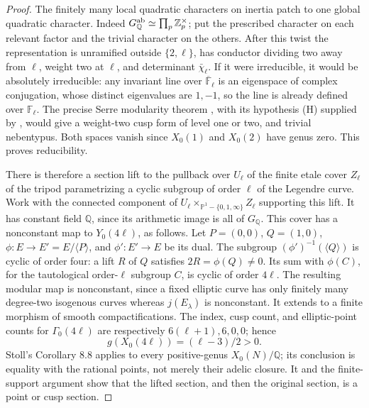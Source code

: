 \begin{proof}
The finitely many local quadratic characters
on inertia patch to one global quadratic
character. Indeed \(G_{\mathbb Q}^{\rm ab}
\simeq\prod_p\mathbb Z_p^\times\); put the
prescribed character on each relevant factor
and the trivial character on the others.
After this twist the representation is
unramified outside \(\{2,\ell\}\), has
conductor dividing two away from \(\ell\),
weight two at \(\ell\), and determinant
\(\bar\chi_\ell\). If it were irreducible,
it would be absolutely irreducible: any
invariant line over \(\overline{\mathbb F}_\ell\)
is an eigenspace of complex conjugation,
whose distinct eigenvalues are \(1,-1\),
so the line is already defined over
\(\mathbb F_\ell\). The precise Serre
modularity theorem
\cite[Theorem 9.1]{DE_KhareWintenberger2009},
with its hypothesis (H) supplied by
\cite[Theorem 0.1 and Corollary 0.2]{DE_Kisin2009},
would give a weight-two cusp form of level
one or two, and trivial nebentypus. Both
spaces vanish since \(X_0(1)\) and
\(X_0(2)\) have genus zero. This proves
reducibility.

There is therefore a section lift to the
pullback over \(U_\ell\) of the finite etale
cover \(Z_\ell\) of the tripod parametrizing
a cyclic subgroup of order \(\ell\) of the
Legendre curve. Work with the connected
component of \(U_\ell\times_{\mathbb P^1-\{0,1,\infty\}}Z_\ell\)
supporting this lift. It has constant
field \(\mathbb Q\), since its arithmetic
image is all of \(G_{\mathbb Q}\). This
cover has a nonconstant map to \(Y_0(4\ell)\),
as follows. Let \(P=(0,0)\), \(Q=(1,0)\),
\(\phi:E\to E'=E/\langle P\rangle\), and
\(\phi':E'\to E\) be its dual. The subgroup
\((\phi')^{-1}(\langle Q\rangle)\) is cyclic
of order four: a lift \(R\) of \(Q\) satisfies
\(2R=\phi(Q)\ne0\). Its sum with \(\phi(C)\),
for the tautological order-\(\ell\) subgroup
\(C\), is cyclic of order \(4\ell\).
The resulting modular map is nonconstant,
since a fixed elliptic curve has only
finitely many degree-two isogenous curves
whereas \(j(E_\lambda)\) is nonconstant.
It extends to a finite morphism of smooth
compactifications. The index, cusp count,
and elliptic-point counts for \(\Gamma_0(4\ell)\)
are respectively \(6(\ell+1),6,0,0\); hence
\[
                 g(X_0(4\ell))=(\ell-3)/2>0.         \tag{D.23.3}
\]
Stoll's Corollary 8.8 \cite{DE_Stoll2007}
applies to every positive-genus \(X_0(N)/\mathbb Q\);
its conclusion is equality with the rational
points, not merely their adelic closure. It
and the finite-support argument show that
the lifted section, and then the original
section, is a point or cusp section.


\end{proof}
